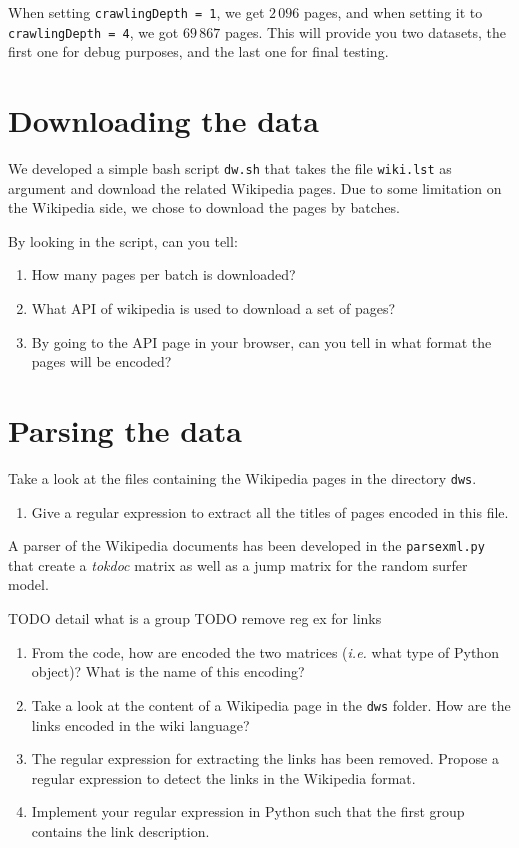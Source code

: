 \documentclass[mathserif, 11pt,c]{article}
\begin{document}
When setting \texttt{crawlingDepth = 1}, we get $2\,096$ pages, and when setting it to \texttt{crawlingDepth = 4}, we got $69\,867$ pages. This will provide you two datasets, the first one for debug purposes, and the last one for final testing.

\section{Downloading the data}

We developed a simple bash script \texttt{dw.sh} that takes the file \texttt{wiki.lst} as argument and download the related Wikipedia pages. Due to some limitation on the Wikipedia side, we chose to download the pages by batches.

By looking in the script, can you tell:
\begin{enumerate}[label=\textbf{Q\thesection.\arabic*}]
	\item How many pages per batch is downloaded?
	\item What API of wikipedia is used to download a set of pages?
	\item By going to the API page in your browser, can you tell in what format the pages will be encoded?
\end{enumerate}


\section{Parsing the data}

Take a look at the files containing the Wikipedia pages in the directory \texttt{dws}.

\begin{enumerate}[label=\textbf{Q\thesection.\arabic*}]
	\item Give a regular expression to extract all the titles of pages encoded in this file.
\end{enumerate}

A parser of the Wikipedia documents has been developed in the \texttt{parsexml.py} that create a \textit{tokdoc} matrix as well as a jump matrix for the random surfer model.

TODO detail what is a group
TODO remove reg ex for links

\begin{enumerate}[label=\textbf{Q\thesection.\arabic*}]
	\item From the code, how are encoded the two matrices (\textit{i.e.} what type of Python object)? What is the name of this encoding?
	\item Take a look at the content of a Wikipedia page in the \texttt{dws} folder. How are the links encoded in the wiki language?
	\item The regular expression for extracting the links has been removed. Propose a regular expression to detect the links in the Wikipedia format.
	\item Implement your regular expression in Python such that the first group contains the link description.
\end{enumerate}
\end{document}
